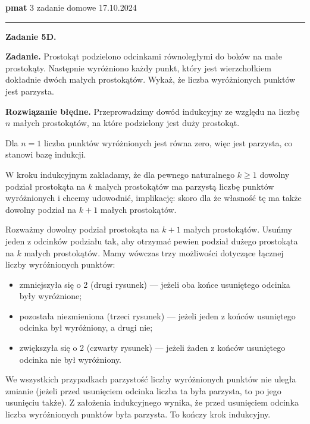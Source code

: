 \documentclass[a4paper, hidelinks, 12pt]{article}
\let\geq=\geqslant %
\begin{document}
\begin{Large}
    \textbf{pmat}
    \hfill
    3 zadanie domowe
    \hfill
    17.10.2024
\end{Large}

\rule{\textwidth}{1pt}


\textbf{Zadanie 5D.}

\medskip 

\textbf{Zadanie.} Prostokąt podzielono odcinkami równoległymi do boków na małe prostokąty.
Następnie wyróżniono każdy punkt, który jest wierzchołkiem dokładnie dwóch małych
prostokątów. Wykaż, że liczba wyróżnionych punktów jest parzysta.

\medskip

\noindent \textbf{Rozwiązanie błędne.} Przeprowadzimy dowód indukcyjny ze względu na liczbę $n$ małych prostokątów, na które podzielony jest duży prostokąt. 

\medskip

Dla $n = 1$ liczba punktów wyróżnionych jest równa zero, więc jest parzysta, co stanowi
bazę indukcji.

\medskip

W kroku indukcyjnym zakładamy, że dla pewnego naturalnego $k \geq 1$ dowolny podział
prostokąta na $k$ małych prostokątów ma parzystą liczbę punktów wyróżnionych i chcemy
udowodnić, implikację: skoro dla że własność tę ma także dowolny podział na $k + 1$ małych prostokątów.

\medskip

Rozważmy dowolny podział prostokąta na $k+1$  małych prostokątów.
Usuńmy jeden z odcinków podziału tak, aby otrzymać pewien podział dużego prostokąta
na $k$ małych prostokątów. Mamy wówczas trzy możliwości dotyczące łącznej liczby
wyróżnionych punktów:
\begin{itemize}
    \item zmniejszyła się o 2 (drugi rysunek) — jeżeli oba końce usuniętego odcinka były
    wyróżnione;
    \item pozostała niezmieniona (trzeci rysunek) — jeżeli jeden z końców usuniętego odcinka był wyróżniony, a drugi nie;
    \item zwiększyła się o 2 (czwarty rysunek) — jeżeli żaden z końców usuniętego odcinka
    nie był wyróżniony.
\end{itemize}

\noindent We wszystkich przypadkach parzystość liczby wyróżnionych punktów nie uległa zmianie (jeżeli przed usunięciem odcinka liczba ta była parzysta, to po jego usunięciu
także). Z założenia indukcyjnego wynika, że przed usunięciem odcinka liczba wyróżnionych punktów była parzysta. To kończy krok indukcyjny.
\end{document}
